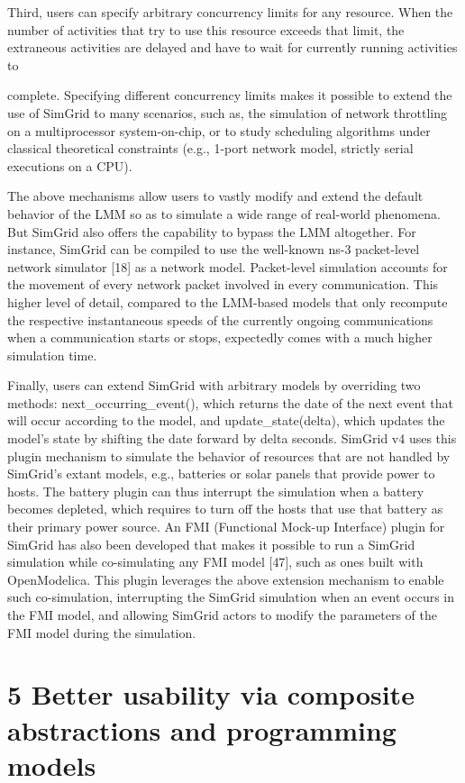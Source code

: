 \documentclass[
]{article}
\begin{document}
Third, users can specify arbitrary concurrency limits for any resource.
When the number of activities that try to use this resource exceeds that
limit, the extraneous activities are delayed and have to wait for
currently running activities to

complete. Specifying different concurrency limits makes it possible to
extend the use of SimGrid to many scenarios, such as, the simulation of
network throttling on a multiprocessor system-on-chip, or to study
scheduling algorithms under classical theoretical constraints (e.g.,
1-port network model, strictly serial executions on a CPU).

The above mechanisms allow users to vastly modify and extend the default
behavior of the LMM so as to simulate a wide range of real-world
phenomena. But SimGrid also offers the capability to bypass the LMM
altogether. For instance, SimGrid can be compiled to use the well-known
ns-3 packet-level network simulator {[}18{]} as a network model.
Packet-level simulation accounts for the movement of every network
packet involved in every communication. This higher level of detail,
compared to the LMM-based models that only recompute the respective
instantaneous speeds of the currently ongoing communications when a
communication starts or stops, expectedly comes with a much higher
simulation time.

Finally, users can extend SimGrid with arbitrary models by overriding
two methods: next\_occurring\_event(), which returns the date of the
next event that will occur according to the model, and
update\_state(delta), which updates the model's state by shifting the
date forward by delta seconds. SimGrid v4 uses this plugin mechanism to
simulate the behavior of resources that are not handled by SimGrid's
extant models, e.g., batteries or solar panels that provide power to
hosts. The battery plugin can thus interrupt the simulation when a
battery becomes depleted, which requires to turn off the hosts that use
that battery as their primary power source. An FMI (Functional Mock-up
Interface) plugin for SimGrid has also been developed that makes it
possible to run a SimGrid simulation while co-simulating any FMI model
{[}47{]}, such as ones built with OpenModelica. This plugin leverages
the above extension mechanism to enable such co-simulation, interrupting
the SimGrid simulation when an event occurs in the FMI model, and
allowing SimGrid actors to modify the parameters of the FMI model during
the simulation.

\section{5 Better usability via composite abstractions and programming
models}\label{better-usability-via-composite-abstractions-and-programming-models}
\end{document}
